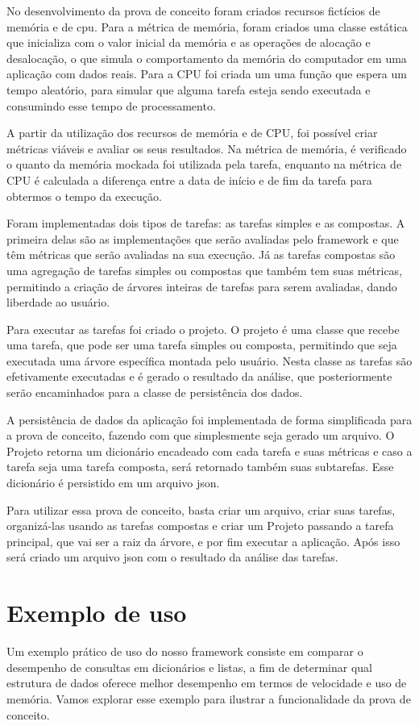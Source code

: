 \documentclass[12pt]{tcc}
\begin{document}
No desenvolvimento da prova de conceito foram criados recursos fictícios de memória e de cpu. Para a métrica de memória, foram criados uma classe estática que inicializa com o valor inicial da memória e as operações de alocação e desalocação, o que simula o comportamento da memória do computador em uma aplicação com dados reais. Para a CPU foi criada um uma função que espera um tempo aleatório, para simular que alguma tarefa esteja sendo executada e consumindo esse tempo de processamento.

A partir da utilização dos recursos de memória e de CPU, foi possível criar métricas viáveis e avaliar os seus resultados. Na métrica de memória, é verificado o quanto da memória mockada foi utilizada pela tarefa, enquanto na métrica de CPU é calculada a diferença entre a data de início e de fim da tarefa para obtermos o tempo da execução. 

Foram implementadas dois tipos de tarefas: as tarefas simples e as compostas. A primeira delas são as implementações que serão avaliadas pelo framework e que têm métricas que serão avaliadas na sua execução. Já as tarefas compostas são uma agregação de tarefas simples ou compostas que também tem suas métricas, permitindo a criação de árvores inteiras de tarefas para serem avaliadas, dando liberdade ao usuário.

Para executar as tarefas foi criado o projeto. O projeto é uma classe que recebe uma tarefa, que pode ser uma tarefa simples ou composta, permitindo que seja executada uma árvore específica montada pelo usuário. Nesta classe as tarefas são efetivamente executadas e é gerado o resultado da análise, que posteriormente serão encaminhados para a classe de persistência dos dados.

A persistência de dados da aplicação foi implementada de forma simplificada para a prova de conceito, fazendo com que simplesmente seja gerado um arquivo. O Projeto retorna um dicionário encadeado com cada tarefa e suas métricas e caso a tarefa seja uma tarefa composta, será retornado também suas subtarefas. Esse dicionário é persistido em um arquivo json. 

Para utilizar essa prova de conceito, basta criar um arquivo, criar suas tarefas, organizá-las usando as tarefas compostas e criar um Projeto passando a tarefa principal, que vai ser a raiz da árvore, e por fim executar a aplicação. Após isso será criado um arquivo json com o resultado da análise das tarefas.

\section{Exemplo de uso}
Um exemplo prático de uso do nosso framework consiste em comparar o desempenho de consultas em dicionários e listas, a fim de determinar qual estrutura de dados oferece melhor desempenho em termos de velocidade e uso de memória. Vamos explorar esse exemplo para ilustrar a funcionalidade da prova de conceito.
\end{document}
